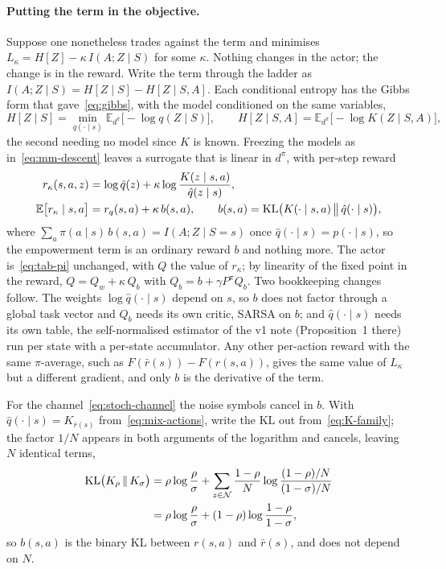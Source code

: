 \documentclass[11pt]{article}
\theoremstyle{remark}
\newcommand{\Ncal}{\mathcal N}
\newcommand{\E}{\mathbb E}
\newcommand{\1}{\mathds{1}}
\newcommand{\occ}{d^{\pi}}
\newcommand{\Hf}[1]{H\!\left[#1\right]}
\begin{document}
\paragraph{Putting the term in the objective.}
Suppose one nonetheless trades against the term and minimises $L_\kappa=\Hf{Z}-\kappa\,I(A;Z\mid S)$ for some $\kappa$.
Nothing changes in the actor; the change is in the reward.
Write the term through the ladder as $I(A;Z\mid S)=\Hf{Z\mid S}-\Hf{Z\mid S,A}$.
Each conditional entropy has the Gibbs form that gave~\eqref{eq:gibbs}, with the model conditioned on the same variables,
\begin{equation}
  \Hf{Z\mid S}=\min_{q(\cdot\mid s)}\E_{\occ}\big[-\log q(Z\mid S)\big],
  \qquad
  \Hf{Z\mid S,A}=\E_{\occ}\big[-\log K(Z\mid S,A)\big],
  \label{eq:gibbs-conditional}
\end{equation}
the second needing no model since $K$ is known.
Freezing the models as in~\eqref{eq:mm-descent} leaves a surrogate that is linear in $\occ$, with per-step reward
\begin{align}
  r_\kappa(s,a,z)&=\log\hat q(z)+\kappa\log\frac{K(z\mid s,a)}{\hat q(z\mid s)}, \notag\\
  \E\big[r_\kappa\mid s,a\big]&=r_q(s,a)+\kappa\,b(s,a),
  \qquad
  b(s,a)=\mathrm{KL}\big(K(\cdot\mid s,a)\,\big\|\,\hat q(\cdot\mid s)\big),
  \label{eq:emp-reward}
\end{align}
where $\sum_a\pi(a\mid s)\,b(s,a)=I(A;Z\mid S=s)$ once $\hat q(\cdot\mid s)=p(\cdot\mid s)$, so the empowerment term is an ordinary reward $b$ and nothing more.
The actor is~\eqref{eq:tab-pi} unchanged, with $Q$ the value of $r_\kappa$; by linearity of the fixed point in the reward, $Q=Q_w+\kappa\,Q_b$ with $Q_b=b+\gamma P^{\pi}Q_b$.
Two bookkeeping changes follow.
The weights $\log\hat q(\cdot\mid s)$ depend on $s$, so $b$ does not factor through a global task vector and $Q_b$ needs its own critic, SARSA on $b$; and $\hat q(\cdot\mid s)$ needs its own table, the self-normalised estimator of the v1 note (Proposition~1 there) run per state with a per-state accumulator.
Any other per-action reward with the same $\pi$-average, such as $F(\bar r(s))-F(r(s,a))$, gives the same value of $L_\kappa$ but a different gradient, and only $b$ is the derivative of the term.

For the channel~\eqref{eq:stoch-channel} the noise symbols cancel in $b$.
With $\hat q(\cdot\mid s)=K_{\bar r(s)}$ from~\eqref{eq:mix-actions}, write the $\mathrm{KL}$ out from~\eqref{eq:K-family}; the factor $1/N$ appears in both arguments of the logarithm and cancels, leaving $N$ identical terms,
\begin{align}
  \mathrm{KL}\big(K_\rho\,\|\,K_\sigma\big)
  &=\rho\log\frac{\rho}{\sigma}
  +\sum_{z\in\Ncal}\frac{1-\rho}{N}\log\frac{(1-\rho)/N}{(1-\sigma)/N} \notag\\
  &=\rho\log\frac{\rho}{\sigma}+(1-\rho)\log\frac{1-\rho}{1-\sigma} ,
  \label{eq:emp-bonus-binary}
\end{align}
so $b(s,a)$ is the binary $\mathrm{KL}$ between $r(s,a)$ and $\bar r(s)$, and does not depend on $N$.
\end{document}
